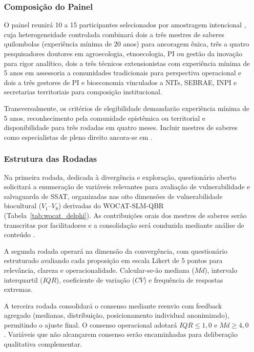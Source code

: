 \documentclass[3p,times]{elsarticle}
\begin{document}
\subsubsection{Composição do Painel}

O painel reunirá 10 a 15 participantes selecionados por amostragem intencional \citep{Patton2015}, cuja heterogeneidade controlada combinará dois a três mestres de saberes quilombolas (experiência mínima de 20 anos) para ancoragem ênica, três a quatro pesquisadores doutores em agroecologia, etnoecologia, PI ou gestão da inovação para rigor analítico, dois a três técnicos extensionistas com experiência mínima de 5 anos em assessoria a comunidades tradicionais para perspectiva operacional e dois a três gestores de PI e bioeconomia vinculados a NITs, SEBRAE, INPI e secretarias territoriais para composição institucional.

Transversalmente, os critérios de elegibilidade demandarão experiência mínima de 5 anos, reconhecimento pela comunidade epistêmica ou territorial e disponibilidade para três rodadas em quatro meses. Incluir mestres de saberes como especialistas de pleno direito ancora-se em \citep{Santos2007,Beaton2000}.

\subsubsection{Estrutura das Rodadas}

Na primeira rodada, dedicada à divergência e exploração, questionário aberto solicitará a enumeração de variáveis relevantes para avaliação de vulnerabilidade e salvaguarda de SSAT, organizadas nas oito dimensões de vulnerabilidade biocultural ($V_1$--$V_8$) derivadas do WOCAT-SLM-QBR (Tabela~\ref{tab:wocat_delphi}). As contribuições orais dos mestres de saberes serão transcritas por facilitadores e a consolidação será conduzida mediante análise de conteúdo \citep{Braun2006}.

A segunda rodada operará na dimensão da convergência, com questionário estruturado avaliando cada proposição em escala Likert de 5 pontos para relevância, clareza e operacionalidade. Calcular-se-ão mediana ($Md$), intervalo interquartil ($IQR$), coeficiente de variação ($CV$) e frequência de respostas extremas.

A terceira rodada consolidará o consenso mediante reenvio com feedback agregado (medianas, distribuição, posicionamento individual anonimizado), permitindo o ajuste final. O consenso operacional adotará $IQR \leq 1,0$ e $Md \geq 4,0$. Variáveis que não alcançarem consenso serão encaminhadas para deliberação qualitativa complementar.
\end{document}
